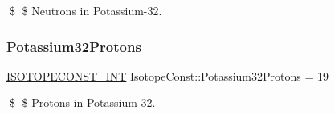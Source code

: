 \$ \$ Neutrons in Potassium-\/32. \mbox{\label{group___isotope_const-_potassium-_k32_gafb2b97e75c02234c8f8ba079a03d17f4}} 
\subsubsection{\texorpdfstring{Potassium32\+Protons}{Potassium32Protons}}
{\footnotesize\ttfamily \mbox{\hyperlink{group___isotope_const-_macros_ga5f18360b3e99483a35c32d789e62621c}{I\+S\+O\+T\+O\+P\+E\+C\+O\+N\+S\+T\+\_\+\+I\+NT}} Isotope\+Const\+::\+Potassium32\+Protons = 19}

\$ \$ Protons in Potassium-\/32. 
